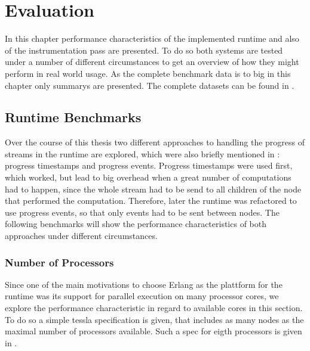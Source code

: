 %
\chapter{Evaluation}
\label{sec:evaluation}

In this chapter performance characteristics of the implemented runtime and also of the instrumentation pass are presented.
To do so both systems are tested under a number of different circumstances to get an overview of how they might perform in real world usage.
As the complete benchmark data is to big in this chapter only summarys are presented.
The complete datasets can be found in .

\section{Runtime Benchmarks}
\label{sec:evaluation:runtime_benchmarks}

Over the course of this thesis two different approaches to handling the progress of streams in the runtime are explored, which were also briefly mentioned in : progress timestamps and progress events.
Progress timestamps were used first, which worked, but lead to big overhead when a great number of computations had to happen, since the whole stream had to be send to all children of the node that performed the computation.
Therefore, later the runtime was refactored to use progress events, so that only events had to be sent between nodes.
The following benchmarks will show the performance characteristics of both approaches under different circumstances.

\subsection{Number of Processors}
\label{sec:evaluation:runtime_benchmarks:num_cores}

Since one of the main motivations to choose Erlang as the plattform for the runtime was its support for parallel execution on many processor cores, we explore the performance characteristic in regard to available cores in this section.
To do so a simple \gls{tessla} specification is given, that includes as many nodes as the maximal number of processors available.
Such a spec for eigth processors is given in .

\begin{figure}
  
\end{figure}

